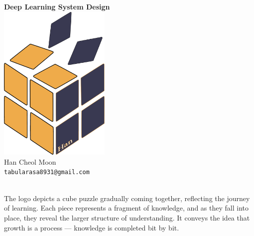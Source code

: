 \documentclass[oneside, a4paper,11pt]{book}
\begin{document}
\begin{titlepage}
	\begin{center}
		\vspace*{5.5cm}
		\textbf{\Huge Deep Learning System Design}\\
        \vspace{2.5cm}
		\includegraphics[width=0.4\textwidth]{./logo/new_logo.pdf}\\
        \vspace{1.0cm}
		Han Cheol Moon\\
		\texttt{tabularasa8931@gmail.com}
		\date{\today}
        \vspace{1.0cm}\\
		\small The logo depicts a cube puzzle gradually coming together, reflecting the journey of learning. Each piece represents a fragment of knowledge, and as they fall into place, they reveal the larger structure of understanding. It conveys the idea that growth is a process — knowledge is completed bit by bit.\\
	\end{center}
\end{titlepage}

\tableofcontents
\newpage
\end{document}
